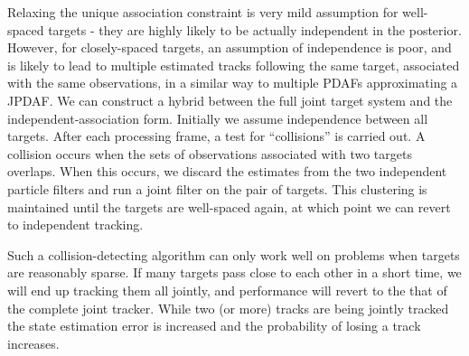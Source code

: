 Relaxing the unique association constraint is very mild assumption for well-spaced targets - they are highly likely to be actually independent in the posterior. However, for closely-spaced targets, an assumption of independence is poor, and is likely to lead to multiple estimated tracks following the same target, associated with the same observations, in a similar way to multiple PDAFs approximating a JPDAF. We can construct a hybrid between the full joint target system and the independent-association form. Initially we assume independence between all targets. After each processing frame, a test for ``collisions'' is carried out. A collision occurs when the sets of observations associated with two targets overlaps. When this occurs, we discard the estimates from the two independent particle filters and run a joint filter on the pair of targets. This clustering is maintained until the targets are well-spaced again, at which point we can revert to independent tracking.

Such a collision-detecting algorithm can only work well on problems when targets are reasonably sparse. If many targets pass close to each other in a short time, we will end up tracking them all jointly, and performance will revert to the that of the complete joint tracker. While two (or more) tracks are being jointly tracked the state estimation error is increased and the probability of losing a track increases.


